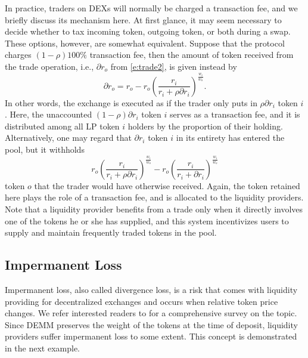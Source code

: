 \documentclass[12pt,a4paper]{article}
\begin{document}
In practice, traders on DEXs will normally be charged a transaction fee, and we briefly discuss its mechanism here. At first glance, it may seem necessary to decide whether to tax incoming token, outgoing token, or both during a swap. These options, however, are somewhat equivalent. Suppose that the protocol charges $(1-\rho)100\%$ transaction fee, then the amount of token received from the trade operation, i.e., $\partial r_o$ from \eqref{e:trade2}, is given instead by
\[\partial r_o=r_o-r_o\left(\frac{r_i}{r_i+\rho\partial r_i}\right)^\frac{w_i}{w_o}.\]
In other words, the exchange is executed as if the trader only puts in $\rho\partial r_i$ token $i$. Here, the unaccounted $(1-\rho)\partial r_i$ token $i$ serves as a transaction fee, and it is distributed among all LP token $i$ holders by the proportion of their holding. Alternatively, one may regard that $\partial r_i$ token $i$ in its entirety has entered the pool, but it withholds
\[r_o\left(\frac{r_i}{r_i+\rho\partial r_i}\right)^\frac{w_i}{w_o}-r_o\left(\frac{r_i}{r_i+\partial r_i}\right)^\frac{w_i}{w_o}\]
token $o$ that the trader would have otherwise received. Again, the token retained here plays the role of a transaction fee, and is allocated to the liquidity providers. Note that a liquidity provider benefits from a trade only when it directly involves one of the tokens he or she has supplied, and this system incentivizes users to supply and maintain frequently traded tokens in the pool.

\subsection{Impermanent Loss}

Impermanent loss, also called divergence loss, is a risk that comes with liquidity providing for decentralized exchanges and occurs when relative token price changes. We refer interested readers to \cite{TPL} for a comprehensive survey on the topic. Since DEMM preserves the weight of the tokens at the time of deposit, liquidity providers suffer impermanent loss to some extent. This concept is demonstrated in the next example.
\end{document}
